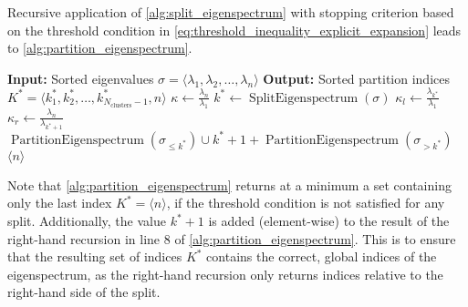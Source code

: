 Recursive application of \cref{alg:split_eigenspectrum} with stopping criterion based on the threshold condition in \cref{eq:threshold_inequality_explicit_expansion} leads to \cref{alg:partition_eigenspectrum}.
\begin{algorithm}[H]
    \caption{$\operatorname{PartitionEigenspectrum}(\sigma)$}
    \begin{algorithmic}[1]
        \State \textbf{Input:} Sorted eigenvalues $\sigma = \langle\lambda_1, \lambda_2, \ldots, \lambda_n\rangle$
        \State \textbf{Output:} Sorted partition indices $K^* = \langle k^*_1, k^*_2, \ldots, k^*_{N_{\text{clusters}}-1}, n\rangle$
        \State $\kappa \gets \frac{\lambda_n}{\lambda_1}$
        \State $k^* \gets \operatorname{SplitEigenspectrum}(\sigma)$
        \State $\kappa_l \gets \frac{\lambda_{k^*}}{\lambda_1}$
        \State $\kappa_r \gets \frac{\lambda_n}{\lambda_{k^*+1}}$
        \State \Return $\operatorname{PartitionEigenspectrum}(\sigma_{\leq k^*}) \cup k^* + 1 + \operatorname{PartitionEigenspectrum}(\sigma_{>k^*})$
        \Else
        \State \Return $\langle n \rangle$ 
        \EndIf
    \end{algorithmic}
    \label{alg:partition_eigenspectrum}
\end{algorithm}
Note that \cref{alg:partition_eigenspectrum} returns at a minimum a set containing only the last index $K^*= \langle n \rangle$, if the threshold condition is not satisfied for any split. Additionally, the value $k^* + 1$ is added (element-wise) to the result of the right-hand recursion in line 8 of \cref{alg:partition_eigenspectrum}. This is to ensure that the resulting set of indices $K^*$ contains the correct, global indices of the eigenspectrum, as the right-hand recursion only returns indices relative to the right-hand side of the split.

